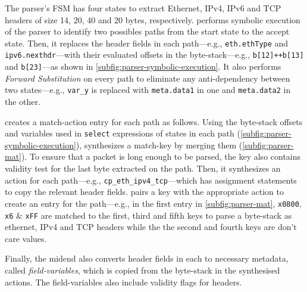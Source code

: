 \documentclass[letterpaper,twocolumn,10pt]{article}
\begin{document}
The parser's FSM has four states to extract Ethernet, IPv4, IPv6 and
TCP headers of size 14, 20, 40 and 20 bytes, respectively.  \ucomp
performs symbolic execution of the parser to identify two possibles
paths from the start state to the accept state. Then, it replaces the
header fields in each path---e.g., \texttt{eth.ethType} and
\texttt{ipv6.nexthdr}---with their evaluated offsets in the
byte-stack---e.g., \texttt{b[12]++b[13]} and \texttt{b[23]}---as shown
in \cref{subfig:parser-symbolic-execution}.  It also performs
\emph{Forward Substitution} \cite{Padua:1986:ACO:7902.7904} on every
path to eliminate any anti-dependency between two states---e.g.,
\texttt{var\_y} is replaced with \texttt{meta.data1} in one and
\texttt{meta.data2} in the other.

\ucomp creates a match-action entry for each path as follows. Using
the byte-stack offsets and variables used in \texttt{select}
expressions of states in each path
(\cref{subfig:parser-symbolic-execution}), \ucomp synthesizes a
match-key by merging them (\cref{subfig:parser-mat}). To ensure that a packet is long enough to be parsed, the key
also contains validity test for the last byte extracted on the
path. Then, it synthesizes an action for each path---e.g.,
\texttt{cp\_eth\_ipv4\_tcp}---which has assignment statements to copy
the relevant header fields. \ucomp pairs a key with the
appropriate action to create an entry for the path---e.g., in the first entry in \cref{subfig:parser-mat},
\texttt{x0800}, \texttt{x6} \& \texttt{xFF} are matched to the first, third and fifth keys to
parse a byte-stack as ethernet, IPv4 and TCP headers while the
the second and fourth keys are don't care values.

Finally, the midend also converts header fields in each \uprogram to
necessary metadata, called \emph{field-variables}, which is copied
from the byte-stack in the synthesised actions. The field-variables
also include validity flags for headers.
\end{document}
